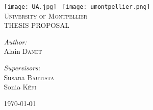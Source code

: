 \begin{titlepage}
\begin{center}

\texttt{[image: UA.jpg]}~ \hfill \texttt{[image: umontpellier.png]}~\\[1cm]

\textsc{\LARGE University of Montpellier}\\[1.5cm]

\textsc{\large THESIS PROPOSAL}\\[0.5cm]




\noindent
\begin{minipage}{0.4\textwidth}
\begin{flushleft} \large
\emph{Author:}\\
Alain \textsc{Danet}
\end{flushleft}
\end{minipage}
\begin{minipage}{0.4\textwidth}
\begin{flushright} \large
\emph{Supervisors:} \\
Susana \textsc{Bautista} \\[0.0cm]
Sonia \textsc{Kéfi}
\end{flushright}
\end{minipage}

\vfill

{\large \today}

\end{center}
\end{titlepage}
